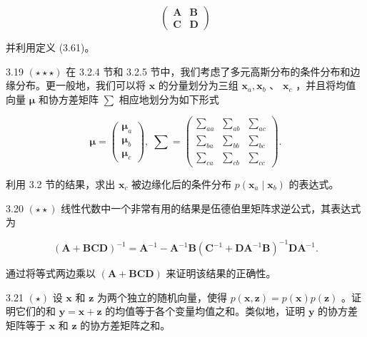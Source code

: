 \documentclass[10pt]{article}
\begin{document}
\[
\left( \begin{array}{ll} \mathbf{A} & \mathbf{B} \\  \mathbf{C} & \mathbf{D} \end{array}\right)  \tag{3.208}
\]

并利用定义 (3.61)。

3.19 \(\left( {\star  \star   \star  }\right)\) 在 3.2.4 节和 3.2.5 节中，我们考虑了多元高斯分布的条件分布和边缘分布。更一般地，我们可以将 \(\mathbf{x}\) 的分量划分为三组 \({\mathbf{x}}_{a},{\mathbf{x}}_{b}\) 、 \({\mathbf{x}}_{c}\) ，并且将均值向量 \(\mathbf{\mu }\) 和协方差矩阵 \(\mathbf{\sum }\) 相应地划分为如下形式

\[
\mathbf{\mu } = \left( \begin{array}{l} {\mathbf{\mu }}_{a} \\  {\mathbf{\mu }}_{b} \\  {\mathbf{\mu }}_{c} \end{array}\right) ,\;\mathbf{\sum } = \left( \begin{array}{lll} {\mathbf{\sum }}_{aa} & {\mathbf{\sum }}_{ab} & {\mathbf{\sum }}_{ac} \\  {\mathbf{\sum }}_{ba} & {\mathbf{\sum }}_{bb} & {\mathbf{\sum }}_{bc} \\  {\mathbf{\sum }}_{ca} & {\mathbf{\sum }}_{cb} & {\mathbf{\sum }}_{cc} \end{array}\right) . \tag{3.209}
\]

利用 3.2 节的结果，求出 \({\mathbf{x}}_{c}\) 被边缘化后的条件分布 \(p\left( {{\mathbf{x}}_{a} \mid  {\mathbf{x}}_{b}}\right)\) 的表达式。

3.20 \(\left( {\star  \star  }\right)\) 线性代数中一个非常有用的结果是伍德伯里矩阵求逆公式，其表达式为

\[
{\left( \mathbf{A} + \mathbf{{BCD}}\right) }^{-1} = {\mathbf{A}}^{-1} - {\mathbf{A}}^{-1}\mathbf{B}{\left( {\mathbf{C}}^{-1} + \mathbf{D}{\mathbf{A}}^{-1}\mathbf{B}\right) }^{-1}\mathbf{D}{\mathbf{A}}^{-1}. \tag{3.210}
\]

通过将等式两边乘以 \(\left( {\mathbf{A} + \mathbf{{BCD}}}\right)\) 来证明该结果的正确性。

3.21 \(\left( \star \right)\) 设 \(\mathbf{x}\) 和 \(\mathbf{z}\) 为两个独立的随机向量，使得 \(p\left( {\mathbf{x},\mathbf{z}}\right)  = p\left( \mathbf{x}\right) p\left( \mathbf{z}\right)\) 。证明它们的和 \(\mathbf{y} = \mathbf{x} + \mathbf{z}\) 的均值等于各个变量均值之和。类似地，证明 \(\mathbf{y}\) 的协方差矩阵等于 \(\mathbf{x}\) 和 \(\mathbf{z}\) 的协方差矩阵之和。
\end{document}
